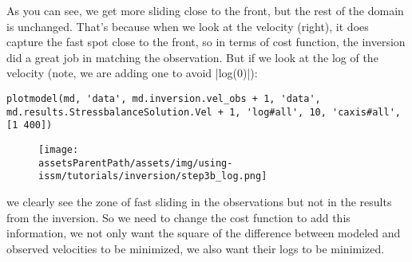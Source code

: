 As you can see, we get more sliding close to the front, but the rest of the domain is unchanged. That's because when we look at the velocity (right), it does capture the fast spot close to the front, so in terms of cost function, the inversion did a great job in matching the observation. But if we look at the log of the velocity (note, we are adding one to avoid \lstinlinebg|log(0)|):
\begin{lstlisting}
plotmodel(md, 'data', md.inversion.vel_obs + 1, 'data', md.results.StressbalanceSolution.Vel + 1, 'log#all', 10, 'caxis#all', [1 400])
\end{lstlisting}
\begin{figure}[H]
	\begin{center}
		\texttt{[image: \\assetsParentPath/assets/img/using-issm/tutorials/inversion/step3b\_log.png]}
	\end{center}
\end{figure}
we clearly see the zone of fast sliding in the observations but not in the results from the inversion. So we need to change the cost function to add this information, we not only want the square of the difference between modeled and observed velocities to be minimized, we also want their logs to be minimized.

